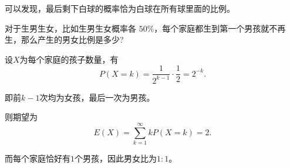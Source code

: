可以发现，最后剩下白球的概率恰为白球在所有球里面的比例。

\begin{thm}{}{}
    对于生男生女，比如生男生女概率各 $50\%$，每个家庭都生到第一个男孩就不再生，那么产生的男女比例是多少?
\end{thm}

设$X$为每个家庭的孩子数量，有$$P(X=k) = \frac{1}{2^{k-1}} \cdot \frac{1}{2} = 2^{-k}.$$

即前$k-1$次均为女孩，最后一次为男孩。

则期望为$$E(X) = \sum_{k=1}^{\infty} k P(X=k) = 2.$$

而每个家庭恰好有$1$个男孩，因此男女比为$1:1$。


